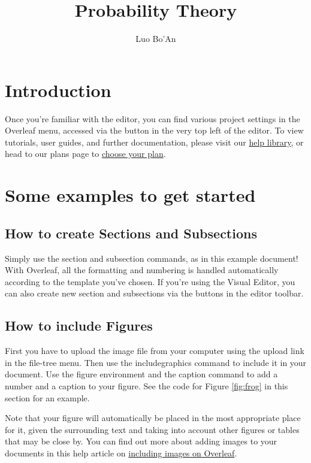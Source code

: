 \documentclass{article}
\title{Probability Theory}
\author{Luo Bo'An }
\begin{document}
\maketitle

\begin{abstract}

\end{abstract}

\section{Introduction}



Once you're familiar with the editor, you can find various project settings in the Overleaf menu, accessed via the button in the very top left of the editor. To view tutorials, user guides, and further documentation, please visit our \href{https://www.overleaf.com/learn}{help library}, or head to our plans page to \href{https://www.overleaf.com/user/subscription/plans}{choose your plan}.

\section{Some examples to get started}

\subsection{How to create Sections and Subsections}

Simply use the section and subsection commands, as in this example document! With Overleaf, all the formatting and numbering is handled automatically according to the template you've chosen. If you're using the Visual Editor, you can also create new section and subsections via the buttons in the editor toolbar.

\subsection{How to include Figures}

First you have to upload the image file from your computer using the upload link in the file-tree menu. Then use the includegraphics command to include it in your document. Use the figure environment and the caption command to add a number and a caption to your figure. See the code for Figure \ref{fig:frog} in this section for an example.

Note that your figure will automatically be placed in the most appropriate place for it, given the surrounding text and taking into account other figures or tables that may be close by. You can find out more about adding images to your documents in this help article on \href{https://www.overleaf.com/learn/how-to/Including_images_on_Overleaf}{including images on Overleaf}.
\end{document}

